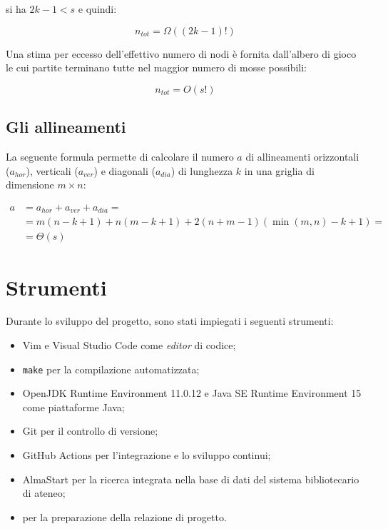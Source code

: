 \documentclass{article}
\begin{document}
si ha $2k - 1 < s$ e quindi:

\begin{equation}
  n_{tot} = \varOmega((2k - 1)!)
\end{equation}

Una stima per eccesso dell'effettivo numero di nodi è fornita dall'albero di
gioco le cui partite terminano tutte nel maggior numero di mosse possibili:

\begin{equation}
  n_{tot} = O(s!)
\end{equation}

\subsection{Gli allineamenti}

La seguente formula permette di calcolare il numero $a$ di allineamenti
orizzontali ($a_{hor}$), verticali ($a_{ver}$) e diagonali ($a_{dia}$) di
lunghezza $k$ in una griglia di dimensione $m \times n$:

\begin{equation}
\begin{split}
  a & = a_{hor} + a_{ver} + a_{dia} = \\
  & = m (n - k + 1) + n (m - k + 1) + 2 (n + m - 1) (\min(m, n) - k + 1) = \\
  & = \varTheta(s)
\end{split}
\end{equation}

\section{Strumenti}

Durante lo sviluppo del progetto, sono stati impiegati i seguenti strumenti:

\begin{itemize}
  \item Vim e Visual Studio Code come \emph{editor} di codice;
  \item \verb!make! per la compilazione automatizzata; 
  \item OpenJDK Runtime Environment 11.0.12 e Java\texttrademark{} SE Runtime
    Environment 15 come piattaforme Java;
  \item Git per il controllo di versione;
  \item GitHub Actions per l'integrazione e lo sviluppo continui;
  \item AlmaStart per la ricerca integrata nella base di dati del sistema
    bibliotecario di ateneo;
  \item \LaTeXe{} per la preparazione della relazione di progetto.
\end{itemize}
\end{document}
